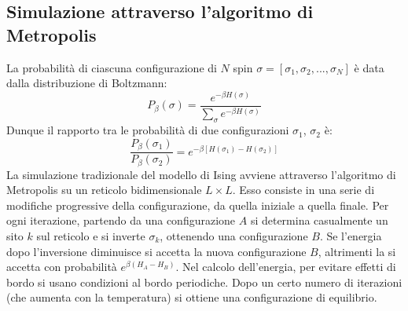 \documentclass[a4paper]{article}
\begin{document}
\subsection{Simulazione attraverso l'algoritmo di Metropolis}
La probabilità di ciascuna configurazione di $N$ spin $\sigma = [\sigma_1, \sigma_2, ..., \sigma_N]$ è data dalla distribuzione di Boltzmann:
\begin{equation}
P_{\beta }(\sigma)={\frac {e^{-\beta H(\sigma )}}{\sum\limits_{\sigma} e^{-\beta H(\sigma )}}}
\end{equation}
Dunque il rapporto tra le probabilità di due configurazioni $\sigma_1$, $\sigma_2$ è:
\begin{equation}
\frac{P_{\beta }(\sigma_1)}{P_{\beta }(\sigma_2)} = e^{-\beta [H(\sigma_1) - H(\sigma_2)]}
\end{equation}
La simulazione tradizionale del modello di Ising avviene attraverso l'algoritmo di Metropolis su un reticolo bidimensionale $L \times L$.
Esso consiste in una serie di modifiche progressive della configurazione, da quella iniziale a quella finale. Per ogni iterazione, partendo da una configurazione $A$ si determina casualmente un sito $k$ sul reticolo e si inverte $\sigma_k$, ottenendo una configurazione $B$. Se l'energia dopo l'inversione diminuisce si accetta la nuova configurazione $B$, altrimenti la si accetta con probabilità $e^{\beta (H_A - H_B)}$. Nel calcolo dell'energia, per evitare effetti di bordo si usano condizioni al bordo periodiche. Dopo un certo numero di iterazioni (che aumenta con la temperatura) si ottiene una configurazione di equilibrio. \cite{metropolis-hastings}
\end{document}
